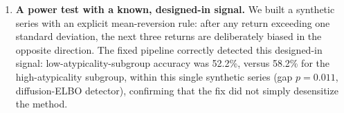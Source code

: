 \documentclass[preprint,12pt]{elsarticle}
\begin{document}
\begin{enumerate}
codebase, using a fresh data download and hand-written embedding and index arithmetic,
repeated the same algebraic check over an independently chosen sample of 47 origins (not matched
to check~2's 33, since the point of this check is that the two scripts share no code, not that
they share a sample size): again, universal overlap under the old
formula and none under the fix. Agreement between this standalone script and check~2 rules out
a shared misreading of the code baked into the investigation's own tooling.
\item \textbf{A power test with a known, designed-in signal.} We built a synthetic series with
an explicit mean-reversion rule: after any return exceeding one standard deviation, the next
three returns are deliberately biased in the opposite direction. The fixed pipeline correctly
detected this designed-in signal: low-atypicality-subgroup accuracy was 52.2\%, versus 58.2\%
for the high-atypicality subgroup, within this single synthetic series (gap $p=0.011$,
diffusion-ELBO detector), confirming that the fix did not simply desensitize the method.
\end{enumerate}
\end{document}
